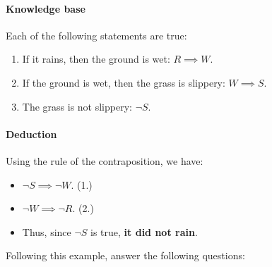 \documentclass[11pt]{article}
\numberwithin{equation}{section}
\begin{document}
\paragraph{Knowledge base} Each of the following statements are true:
\begin{enumerate}
    \item If it rains, then the ground is wet: $R \implies W$.
    \item If the ground is wet, then the grass is slippery: $ W \implies S$.
    \item The grass is not slippery: $\neg S$.
\end{enumerate}

\paragraph{Deduction}
Using the rule of the contraposition, we have:
\begin{itemize}
    \item[] $ \neg S \implies \neg W$. \quad\quad (1.)
    \item[] $ \neg W \implies \neg R$. \quad\quad (2.)
    \item[] Thus, since $\neg S$ is true, \textbf{it did not rain}.
\end{itemize}

\bigskip
Following this example, answer the following questions:
\end{document}
